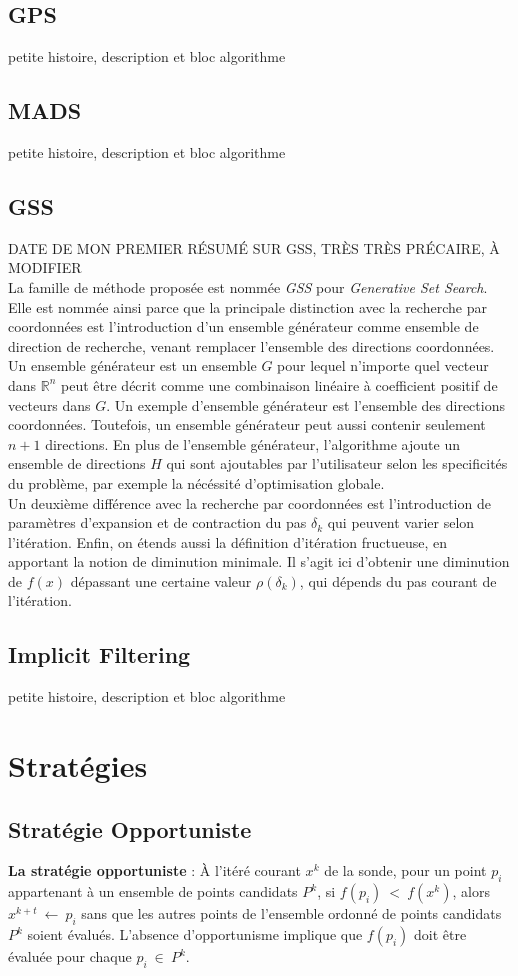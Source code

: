 \documentclass[letterpaper]{scrartcl}
\newcommand{\R}{\mathbb{R}}
\begin{document}
	\subsection{GPS}
	petite histoire, description et bloc algorithme
	\subsection{MADS}
	petite histoire, description et bloc algorithme
	\subsection{GSS}
	DATE DE MON PREMIER RÉSUMÉ SUR GSS, TRÈS TRÈS PRÉCAIRE, À MODIFIER\\
	La famille de méthode proposée est nommée \textit{GSS} pour \textit{Generative Set Search}. Elle est nommée ainsi parce que la principale distinction avec la recherche par coordonnées est l'introduction d'un ensemble générateur comme ensemble de direction de recherche, venant remplacer l'ensemble des directions coordonnées. Un ensemble générateur est un ensemble $G$ pour lequel n'importe quel vecteur dans $\R^n$ peut être décrit comme une combinaison linéaire à coefficient positif de vecteurs dans $G$. Un exemple d'ensemble générateur est l'ensemble des directions coordonnées. Toutefois, un ensemble générateur peut aussi contenir seulement $n+1$ directions. En plus de l'ensemble générateur, l'algorithme ajoute un ensemble de directions $H$ qui sont ajoutables par l'utilisateur selon les specificités du problème, par exemple la nécéssité d'optimisation globale.\\
	Un deuxième différence avec la recherche par coordonnées est l'introduction de paramètres d'expansion et de contraction du pas $\delta_k$ qui peuvent varier selon l'itération. Enfin, on étends aussi la définition d'itération fructueuse, en apportant la notion de diminution minimale. Il s'agit ici d'obtenir une diminution de $f(x)$ dépassant une certaine valeur $\rho(\delta_k)$, qui dépends du pas courant de l'itération.\\
	\subsection{Implicit Filtering}
	petite histoire, description et bloc algorithme
\section{Stratégies}
	\subsection{Stratégie Opportuniste}
\textbf{La stratégie opportuniste} : À l'itéré courant $x^{k}$ de la sonde, pour un point $p_i$ appartenant à un ensemble de points candidats $P^k$, si $f(p_i)\ < \ f(x^k)$, alors $x^{k+t}\ \leftarrow \ p_i$ sans que les autres points de l'ensemble ordonné de points candidats $P^k$ soient évalués. L'absence d'opportunisme implique que $f(p_i)$ doit être évaluée pour chaque $p_i \ \in \ P^k$. 
\end{document}
